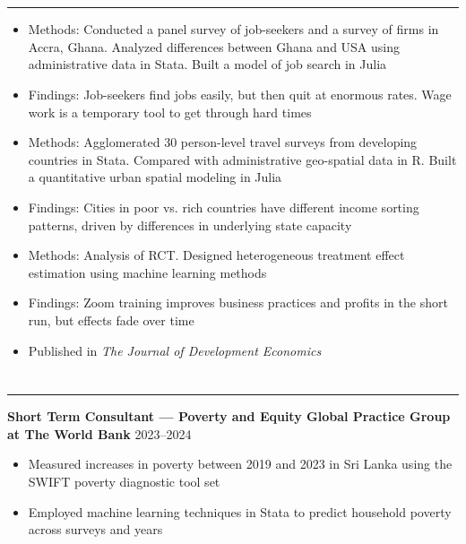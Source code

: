 \documentclass[10pt]{article}
\newenvironment{customitemize}
{ \begin{itemize}[leftmargin=\parindent, topsep = 0.2pt, itemsep = -3pt] }
{\end{itemize} }
\begin{document}
\section*{}
\noindent \rule{\textwidth}{1pt} 
\begin{customitemize}
\item Methods: Conducted a panel survey of job-seekers and a survey of firms in Accra, Ghana. Analyzed differences between Ghana and USA using administrative data in Stata. Built a model of job search in Julia
\item Findings: Job-seekers find jobs easily, but then quit at enormous rates. Wage work is a temporary tool to get through hard times 
\end{customitemize}
\begin{customitemize}
	\item Methods: Agglomerated 30 person-level travel surveys from developing countries in Stata. Compared with administrative geo-spatial data in R. Built a quantitative urban spatial modeling in Julia
	\item Findings: Cities in poor vs. rich countries have different income sorting patterns, driven by differences in underlying state capacity
\end{customitemize}
\begin{customitemize}
	\item Methods: Analysis of RCT. Designed heterogeneous treatment effect estimation using machine learning methods
	\item Findings: Zoom training improves business practices and profits in the short run, but effects fade over time
	\item Published in \textit{The Journal of Development Economics}
\end{customitemize}

\section*{} 
\noindent \rule{\textwidth}{1pt} 

\noindent \textbf{Short Term Consultant --- Poverty and Equity Global Practice Group at The World Bank}  \hfill 2023--2024
\begin{customitemize}
	\item Measured increases in poverty between 2019 and 2023 in Sri Lanka using the SWIFT poverty diagnostic tool set
	\item Employed machine learning techniques in Stata to predict household poverty across surveys and years
\end{customitemize}
\end{document}
